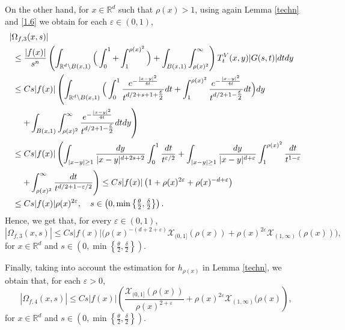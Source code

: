 \documentclass[10pt, a4paper, reqno]{amsart}
\theoremstyle{definition}
\theoremstyle{remark}
\numberwithin{equation}{section}
\begin{document}
On the other hand, for $x\in \mathbb R^d$ such that $\rho (x)>1$, using again Lemma \ref{techn} and \eqref{1.6} we obtain for each $\varepsilon \in (0,1)$, 
\begin{align*}
 |\Omega_{f,3}(x,s)|&\\
 &\hspace{-1.5cm} \leq \frac{|f(x)|}{s^n}\left(\int_{\mathbb R^d\setminus B(x,1)}\Big(\int_0^1 +\int_1^{\rho (x)^2}\Big)+\int_{B(x,1)}\int_{\rho (x)^2}^\infty \right)T_t^V(x,y)|G(s,t)|dtdy\\
    &\hspace{-1.5cm}\leq Cs|f(x)|\left(\int_{\mathbb R^d\setminus B(x,1)}\Big(\int_0^1\frac{e^{-\frac{|x-y|^2}{4t}}}{t^{d/2+s+1+\tfrac{\varepsilon}{2}}}dt+\int_1^{\rho (x)^2}\frac{e^{-\frac{|x-y|^2}{4t}}}{t^{d/2+1-\tfrac{\varepsilon}{2}}}dt\Big)dy\right.\\
    &\hspace{-1.5cm}\left.\quad +\int_{B(x,1)}\int_{\rho (x)^2}^\infty \frac{e^{-\frac{|x-y|^2}{4t}}}{t^{d/2+1-\tfrac{\varepsilon}{2}}}dtdy\right)\\
     &\hspace{-1.5cm}\leq Cs|f(x)|\left(\int_{|x-y|\geq 1}\frac{dy}{|x-y|^{d+2s+2}}\int_0^1\frac{dt}{t^{\varepsilon /2}}+\int_{|x-y|\geq 1}\frac{dy}{|x-y|^{d+\varepsilon}}\int_1^{\rho (x)^2}\frac{dt}{t^{1-\varepsilon}}\right.\\
     &\hspace{-1.5cm}\left.\quad +\int_{\rho (x)^2}^\infty \frac{dt}{t^{d/2+1-\varepsilon /2}}\right)\leq Cs|f(x)|\left(1+\rho (x)^{2\varepsilon}+\rho (x)^{-d+\varepsilon}\right)\\
    &\hspace{-1.5cm}\leq Cs|f(x)|\rho (x)^{2\varepsilon}, \quad s\in \left(0,\min\left\{\tfrac{\theta }{2},\tfrac{\delta}{2}\right\}\right).
\end{align*}
Hence, we get that, for every $\varepsilon \in (0,1)$, 
\begin{equation}\label{Omega3}
|\Omega_{f,3}(x,s)|\leq Cs|f(x)|\Big(\rho (x)^{-(d+2+\varepsilon)}\mathcal X_{(0,1]}(\rho (x))+\rho (x)^{2\varepsilon}\mathcal X_{(1,\infty )}(\rho (x))\Big),
\end{equation}
for $x\in \mathbb R^d$ and $s\in (0,\min\left\{\tfrac{\theta}{2},\tfrac{\delta}{2}\right\})$.

Finally, taking into account the estimation for $h_{\rho(x)}$ in Lemma \ref{techn}, we obtain that, for each $\varepsilon >0$, 
\begin{equation}\label{Omega4}
|\Omega_{f,4}(x,s)|\leq Cs|f(x)|\left(\frac{\mathcal X_{(0,1]}(\rho (x))}{\rho (x)^{2+\varepsilon}}+\rho (x)^{2\varepsilon}\mathcal X_{(1,\infty )}(\rho (x)\right),
\end{equation}
for $x\in \mathbb R^d$ and $s\in (0,\min\left\{\tfrac{\theta}{2},\tfrac{\delta}{2}\right\})$.
\end{document}
